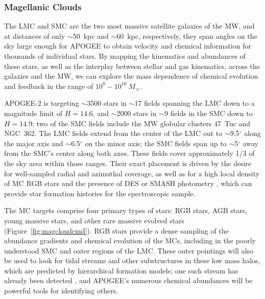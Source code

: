 \documentclass[12pt,twocolumn]{emulateapj}
\begin{document}
\subsubsection{Magellanic Clouds}
\label{sec:mag_clouds}

The LMC and SMC are the two most massive satellite galaxies of the MW, and at distances of only $\sim$50~kpc and $\sim$60~kpc, respectively, they span angles on the sky large enough for APOGEE to obtain velocity and chemical information for thousands of individual stars.  By mapping the kinematics and abundances of these stars, as well as the interplay between stellar and gas kinematics, across the galaxies and the MW, we can explore the mass dependence of chemical evolution and feedback in the range of $10^8-10^{10}~M_\sun$.

APOGEE-2 is targeting $\sim$3500 stars in $\sim$17 fields spanning the LMC down to a magnitude limit of $H=14.6$, and $\sim$2000 stars in $\sim$9 fields in the SMC down to $H=14.9$; two of the SMC fields include the MW globular clusters 47~Tuc and NGC~362.  
The LMC fields extend from the center of the LMC out to $\sim$9.5$^\circ$ along the major axis and $\sim$6.5$^\circ$ on the minor axis; the SMC fields span up to $\sim$5$^\circ$ away from the SMC's center along both axes.  These fields cover approximately 1/3 of the sky area within those ranges. Their exact placement is driven by the desire for well-sampled radial and azimuthal coverage, as well as for a high local density of MC RGB stars and the presence of DES or SMASH photometry \citep[][]{DESCollab_2016_DESoverview,Nidver_2017_smash}, which can provide star formation histories for the spectroscopic sample.

The MC targets comprise four primary types of stars: RGB stars, AGB stars, young massive stars, and other rare massive evolved stars (Figure~\ref{fig:magcloudcmd}).  RGB stars provide a dense sampling of the abundance gradients and chemical evolution of the MCs, including in the poorly understood SMC and outer regions of the LMC.  These outer pointings will also be used to look for tidal streams and other substructures in these low mass halos, which are predicted by hierarchical formation models; one such stream has already been detected \citep{Olsen_2011_LMCaccretion}, and APOGEE's numerous chemical abundances will be powerful tools for identifying others.
\end{document}
